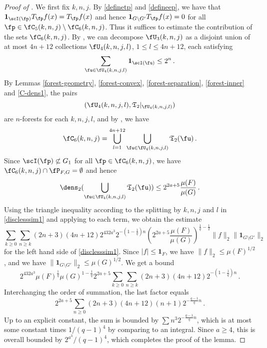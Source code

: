 \begin{proof}[Proof of ]
    \leanok

    We first fix $k,n, j$.
    By \eqref{definetp} and \eqref{defineep}, we have that
    $\mathbf{1}_{\scI(\fp)} T_{\fp}f(x) = T_{\fp}f(x)$ and hence $\mathbf{1}_{G \setminus G'} T_{\fp}f(x)= 0$ for all $\fp \in \fC_5(k,n,j) \setminus \fC_6(k,n,j)$.
    Thus it suffices to estimate the contribution of the sets $\fC_6(k,n,j)$. By , we can decompose $\fU_3(k,n,j)$ as a disjoint union of at most $4n + 12$ collections $\fU_4(k,n,j,l)$, $1 \le l \le 4n+12$, each satisfying
    $$
        \sum_{\fu \in \fU_4(k,n,j,l)} \mathbf{1}_{\scI(\fu)} \le 2^n\,.
    $$
    By Lemmas \ref{forest-geometry}, \ref{forest-convex}, \ref{forest-separation}, \ref{forest-inner} and \ref{C-dens1}, the pairs
    $$
        (\fU_4(k,n,j,l), \mathfrak{T}_2|_{\fU_4(k,n,j,l)})
    $$
    are $n$-forests for each $k,n,j,l$, and by , we have
    $$
        \fC_6(k,n,j) = \bigcup_{l = 1}^{4n + 12} \bigcup_{\fu \in \fU_4(k,n,j,l)} \mathfrak{T}_2(\fu)\,.
    $$
    Since $\scI(\fp) \not\subset G_1$ for all $\fp \in \fC_6(k,n,j)$, we have $\fC_6(k,n,j) \cap \fP_{F,G} = \emptyset$ and hence
    $$
        \dens_2(\bigcup_{\fu \in \fU_4(k,n,j,l)} \mathfrak{T}_2(\fu)) \le 2^{2a + 5} \frac{\mu(F)}{\mu(G)}\,.
    $$
    Using the triangle inequality according to the splitting by $k,n,j$ and $l$ in \eqref{disclesssim1} and applying  to each term, we obtain the estimate
    $$
        \sum_{k \ge 0}\sum_{n \ge k} (2n+3)(4n+12) 2^{432a^3}2^{-(1-\frac{1}{q})n}(2^{2a+5} \frac{\mu(F)}{\mu(G)})^{\frac{1}{q} - \frac{1}{2}} \|f\|_2 \|\mathbf{1}_{G\setminus G'}\|_2
    $$
    for the left hand side of \eqref{disclesssim1}. Since $|f| \le \mathbf{1}_F$, we have $\|f\|_2 \le \mu(F)^{1/2}$, and we have $\|\mathbf{1}_{G\setminus G'}\|_2 \le \mu(G)^{1/2}$.
    We get a bound
    $$
        2^{432a^3} \mu(F)^{\frac{1}{q}} \mu(G)^{1
        -\frac{1}{q}} 2^{2a+5}\sum_{k \ge 0}\sum_{n \ge k}(2n+3)(4n+12) 2^{-(1-\frac{1}{q})n}\,.
    $$ %
    Interchanging the order of summation, the last factor equals
    $$
        2^{2a+5} \sum_{n \ge 0} (2n+3)(4n+12) (n+1) 2^{-\frac{q-1}{q}n}\,.
    $$
    Up to an explicit constant, the sum is bounded by $\sum n^3 2^{-\frac{q-1}{q}n}$, which is at most
    some constant times $1/(q-1)^4$ by comparing to an integral. Since $a \ge 4$, this is overall bounded by $2^{a^3}/(q-1)^4$,
    which completes the proof of the lemma.
\end{proof}

